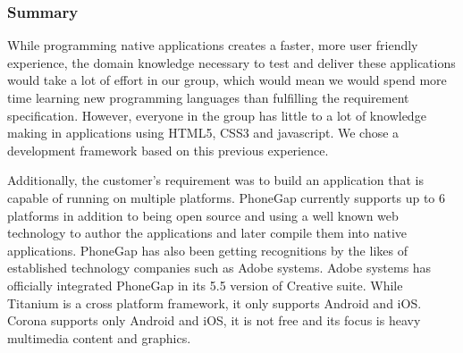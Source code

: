 \subsubsection{Summary}
While programming native applications creates a faster, more user friendly experience, the domain knowledge necessary to test and deliver these applications would take a lot of effort in our group, which would mean we would spend more time learning new programming languages than fulfilling the requirement specification. However, everyone in the group has little to a lot of knowledge making in applications using HTML5, CSS3 and javascript. We chose a development framework based on this previous experience.

Additionally, the customer's requirement was to build an application that is capable of running on multiple platforms. PhoneGap currently supports up to 6 platforms in addition to being open source and using a well known web technology to author the applications and later compile them into native applications. PhoneGap has also been getting recognitions by the likes of established technology companies such as Adobe systems.  Adobe systems has officially integrated PhoneGap in its 5.5 version of Creative suite. While Titanium is a cross platform framework, it only supports Android and iOS. Corona supports only Android and iOS, it is not free and its focus is heavy multimedia content and graphics.

